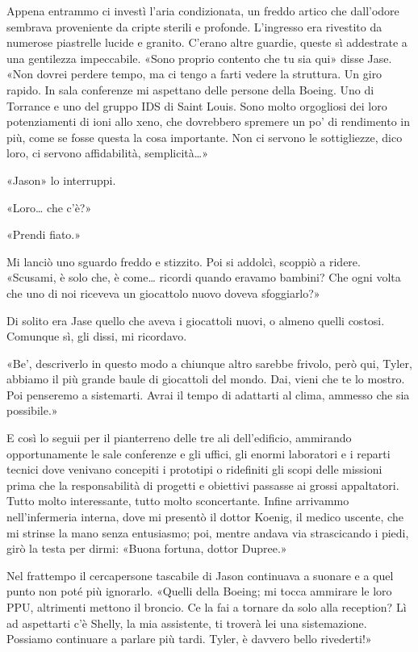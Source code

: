 Appena entrammo ci investì l'aria condizionata, un freddo artico che
dall'odore sembrava proveniente da cripte sterili e profonde. L'ingresso
era rivestito da numerose piastrelle lucide e granito. C'erano altre
guardie, queste sì addestrate a una gentilezza impeccabile. «Sono
proprio contento che tu sia qui» disse Jase. «Non dovrei perdere tempo,
ma ci tengo a farti vedere la struttura. Un giro rapido. In sala
conferenze mi aspettano delle persone della Boeing. Uno di Torrance e
uno del gruppo IDS di Saint Louis. Sono molto orgogliosi dei loro
potenziamenti di ioni allo xeno, che dovrebbero spremere un po' di
rendimento in più, come se fosse questa la cosa importante. Non ci
servono le sottigliezze, dico loro, ci servono affidabilità,
semplicità\ldots»

«Jason» lo interruppi.

«Loro\ldots{} che c'è?»

«Prendi fiato.»

Mi lanciò uno sguardo freddo e stizzito. Poi si addolcì, scoppiò a
ridere. «Scusami, è solo che, è come\ldots{} ricordi quando eravamo
bambini? Che ogni volta che uno di noi riceveva un giocattolo nuovo
doveva sfoggiarlo?»

Di solito era Jase quello che aveva i giocattoli nuovi, o almeno quelli
costosi. Comunque sì, gli dissi, mi ricordavo.

«Be', descriverlo in questo modo a chiunque altro sarebbe frivolo, però
qui, Tyler, abbiamo il più grande baule di giocattoli del mondo. Dai,
vieni che te lo mostro. Poi penseremo a sistemarti. Avrai il tempo di
adattarti al clima, ammesso che sia possibile.»

E così lo seguii per il pianterreno delle tre ali dell'edificio,
ammirando opportunamente le sale conferenze e gli uffici, gli enormi
laboratori e i reparti tecnici dove venivano concepiti i prototipi o
ridefiniti gli scopi delle missioni prima che la responsabilità di
progetti e obiettivi passasse ai grossi appaltatori. Tutto molto
interessante, tutto molto sconcertante. Infine arrivammo nell'infermeria
interna, dove mi presentò il dottor Koenig, il medico uscente, che mi
strinse la mano senza entusiasmo; poi, mentre andava via strascicando i
piedi, girò la testa per dirmi: «Buona fortuna, dottor Dupree.»

Nel frattempo il cercapersone tascabile di Jason continuava a suonare e
a quel punto non poté più ignorarlo. «Quelli della Boeing; mi tocca
ammirare le loro PPU, altrimenti mettono il broncio. Ce la fai a tornare
da solo alla reception? Lì ad aspettarti c'è Shelly, la mia assistente,
ti troverà lei una sistemazione. Possiamo continuare a parlare più
tardi. Tyler, è davvero bello rivederti!»

